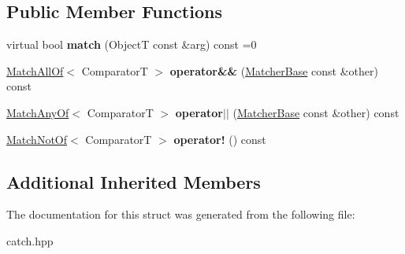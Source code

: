 \subsection*{Public Member Functions}
\begin{DoxyCompactItemize}
\item 
\mbox{\label{structCatch_1_1Matchers_1_1Impl_1_1MatcherBase_a29e69ed1b31945752c484386349a0fcc}} 
virtual bool {\bfseries match} (ObjectT const \&arg) const =0
\item 
\mbox{\label{structCatch_1_1Matchers_1_1Impl_1_1MatcherBase_a3deede6b29d20c15cb5efc79df40a520}} 
\hyperlink{structCatch_1_1Matchers_1_1Impl_1_1MatchAllOf}{Match\+All\+Of}$<$ ComparatorT $>$ {\bfseries operator\&\&} (\hyperlink{structCatch_1_1Matchers_1_1Impl_1_1MatcherBase}{Matcher\+Base} const \&other) const
\item 
\mbox{\label{structCatch_1_1Matchers_1_1Impl_1_1MatcherBase_ae0345ee76d109ac6d0241be261450ebc}} 
\hyperlink{structCatch_1_1Matchers_1_1Impl_1_1MatchAnyOf}{Match\+Any\+Of}$<$ ComparatorT $>$ {\bfseries operator$\vert$$\vert$} (\hyperlink{structCatch_1_1Matchers_1_1Impl_1_1MatcherBase}{Matcher\+Base} const \&other) const
\item 
\mbox{\label{structCatch_1_1Matchers_1_1Impl_1_1MatcherBase_a85174b5b27113f7bdc47c140c1c72602}} 
\hyperlink{structCatch_1_1Matchers_1_1Impl_1_1MatchNotOf}{Match\+Not\+Of}$<$ ComparatorT $>$ {\bfseries operator!} () const
\end{DoxyCompactItemize}
\subsection*{Additional Inherited Members}


The documentation for this struct was generated from the following file\+:\begin{DoxyCompactItemize}
\item 
catch.\+hpp\end{DoxyCompactItemize}
